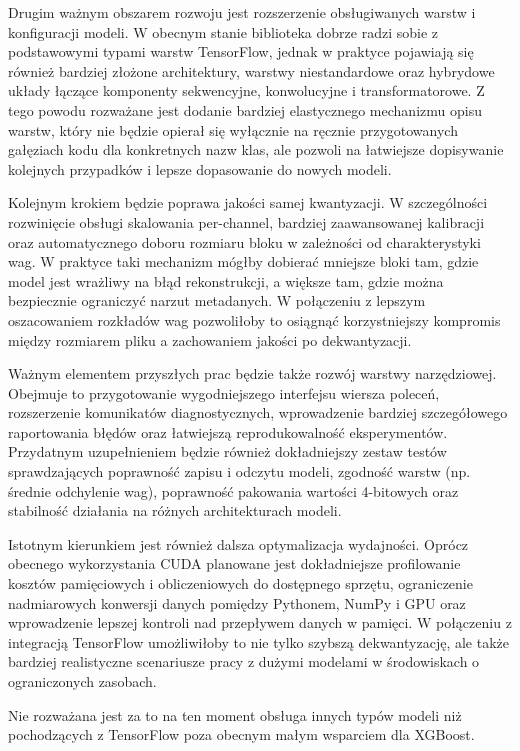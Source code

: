 Drugim ważnym obszarem rozwoju jest rozszerzenie obsługiwanych warstw i konfiguracji modeli. W obecnym stanie biblioteka dobrze radzi sobie z podstawowymi typami warstw TensorFlow, jednak w praktyce pojawiają się również bardziej złożone architektury, warstwy niestandardowe oraz hybrydowe układy łączące komponenty sekwencyjne, konwolucyjne i transformatorowe. Z tego powodu rozważane jest dodanie bardziej elastycznego mechanizmu opisu warstw, który nie będzie opierał się wyłącznie na ręcznie przygotowanych gałęziach kodu dla konkretnych nazw klas, ale pozwoli na łatwiejsze dopisywanie kolejnych przypadków i lepsze dopasowanie do nowych modeli.

Kolejnym krokiem będzie poprawa jakości samej kwantyzacji. W szczególności rozwinięcie obsługi skalowania per-channel, bardziej zaawansowanej kalibracji oraz automatycznego doboru rozmiaru bloku w zależności od charakterystyki wag. W praktyce taki mechanizm mógłby dobierać mniejsze bloki tam, gdzie model jest wrażliwy na błąd rekonstrukcji, a większe tam, gdzie można bezpiecznie ograniczyć narzut metadanych. W połączeniu z lepszym oszacowaniem rozkładów wag pozwoliłoby to osiągnąć korzystniejszy kompromis między rozmiarem pliku a zachowaniem jakości po dekwantyzacji.

Ważnym elementem przyszłych prac będzie także rozwój warstwy narzędziowej. Obejmuje to przygotowanie wygodniejszego interfejsu wiersza poleceń, rozszerzenie komunikatów diagnostycznych, wprowadzenie bardziej szczegółowego raportowania błędów oraz łatwiejszą reprodukowalność eksperymentów. Przydatnym uzupełnieniem będzie również dokładniejszy zestaw testów sprawdzających poprawność zapisu i odczytu modeli, zgodność warstw (np. średnie odchylenie wag), poprawność pakowania wartości 4-bitowych oraz stabilność działania na różnych architekturach modeli.

Istotnym kierunkiem jest również dalsza optymalizacja wydajności. Oprócz obecnego wykorzystania CUDA planowane jest dokładniejsze profilowanie kosztów pamięciowych i obliczeniowych do dostępnego sprzętu, ograniczenie nadmiarowych konwersji danych pomiędzy Pythonem, NumPy i GPU oraz wprowadzenie lepszej kontroli nad przepływem danych w pamięci. W połączeniu z integracją TensorFlow umożliwiłoby to nie tylko szybszą dekwantyzację, ale także bardziej realistyczne scenariusze pracy z dużymi modelami w środowiskach o ograniczonych zasobach.

Nie rozważana jest za to na ten moment obsługa innych typów modeli niż pochodzących z TensorFlow poza obecnym małym wsparciem dla XGBoost.